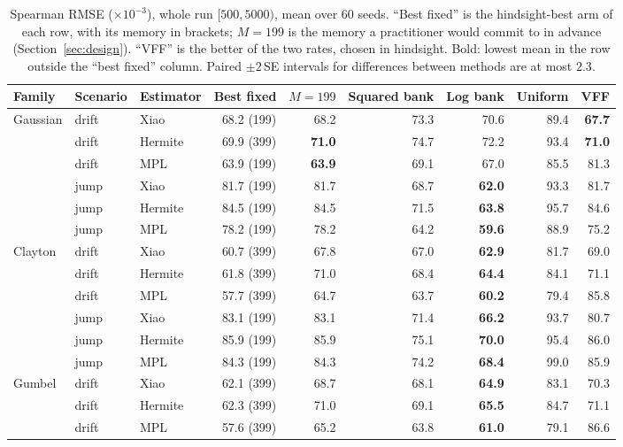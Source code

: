 \begin{table}[ht]
  \centering
  \caption{Spearman RMSE ($\times10^{-3}$), whole run $[500,5000)$, mean over 60 seeds. ``Best
    fixed'' is the hindsight-best arm of each row, with its memory in brackets; $M=199$ is the
    memory a practitioner would commit to in advance (Section~\ref{sec:design}). ``VFF'' is the
    better of the two rates, chosen in hindsight. Bold: lowest mean in the row outside the
    ``best fixed'' column. Paired $\pm2$\,SE intervals for differences between methods are
    at most $2.3$.}
  \label{tab:bank_rmse}
  \small
  \begin{tabular}{lllrrrrrr}
    \toprule
    Family & Scenario & Estimator & Best fixed & $M=199$ & Squared bank & Log bank & Uniform & VFF \\
    \midrule
    Gaussian & drift & Xiao & 68.2 (199) & 68.2 & 73.3 & 70.6 & 89.4 & \textbf{67.7} \\
     & drift & Hermite & 69.9 (399) & \textbf{71.0} & 74.7 & 72.2 & 93.4 & \textbf{71.0} \\
     & drift & MPL & 63.9 (199) & \textbf{63.9} & 69.1 & 67.0 & 85.5 & 81.3 \\
     & jump & Xiao & 81.7 (199) & 81.7 & 68.7 & \textbf{62.0} & 93.3 & 81.7 \\
     & jump & Hermite & 84.5 (199) & 84.5 & 71.5 & \textbf{63.8} & 95.7 & 84.6 \\
     & jump & MPL & 78.2 (199) & 78.2 & 64.2 & \textbf{59.6} & 88.9 & 75.2 \\
    \addlinespace
    Clayton & drift & Xiao & 60.7 (399) & 67.8 & 67.0 & \textbf{62.9} & 81.7 & 69.0 \\
     & drift & Hermite & 61.8 (399) & 71.0 & 68.4 & \textbf{64.4} & 84.1 & 71.1 \\
     & drift & MPL & 57.7 (399) & 64.7 & 63.7 & \textbf{60.2} & 79.4 & 85.8 \\
     & jump & Xiao & 83.1 (199) & 83.1 & 71.4 & \textbf{66.2} & 93.7 & 80.7 \\
     & jump & Hermite & 85.9 (199) & 85.9 & 75.1 & \textbf{70.0} & 95.4 & 86.0 \\
     & jump & MPL & 84.3 (199) & 84.3 & 74.2 & \textbf{68.4} & 99.0 & 85.9 \\
    \addlinespace
    Gumbel & drift & Xiao & 62.1 (399) & 68.7 & 68.1 & \textbf{64.9} & 83.1 & 70.3 \\
     & drift & Hermite & 62.3 (399) & 71.0 & 69.1 & \textbf{65.5} & 84.7 & 71.1 \\
     & drift & MPL & 57.6 (399) & 65.2 & 63.8 & \textbf{61.0} & 79.1 & 86.6 \\

\end{tabular}
\end{table}
